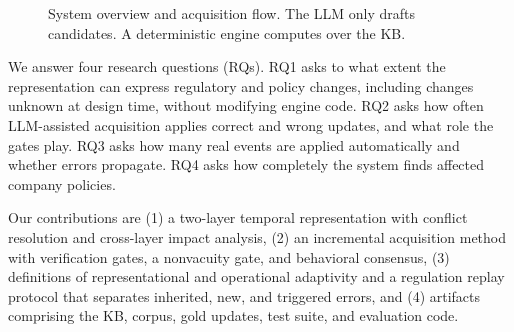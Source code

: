 \documentclass[conference]{IEEEtran}
\begin{document}
\begin{figure}[t]
\centering
{}
\caption{System overview and acquisition flow. The LLM only drafts candidates. A deterministic engine computes over the KB.}
\label{fig:alur}
\end{figure}

We answer four research questions (RQs). RQ1 asks to what extent the representation can express regulatory and policy changes, including changes unknown at design time, without modifying engine code. RQ2 asks how often LLM-assisted acquisition applies correct and wrong updates, and what role the gates play. RQ3 asks how many real events are applied automatically and whether errors propagate. RQ4 asks how completely the system finds affected company policies.

Our contributions are (1) a two-layer temporal representation with conflict resolution and cross-layer impact analysis, (2) an incremental acquisition method with verification gates, a nonvacuity gate, and behavioral consensus, (3) definitions of representational and operational adaptivity and a regulation replay protocol that separates inherited, new, and triggered errors, and (4) artifacts comprising the KB, corpus, gold updates, test suite, and evaluation code.

\end{document}
